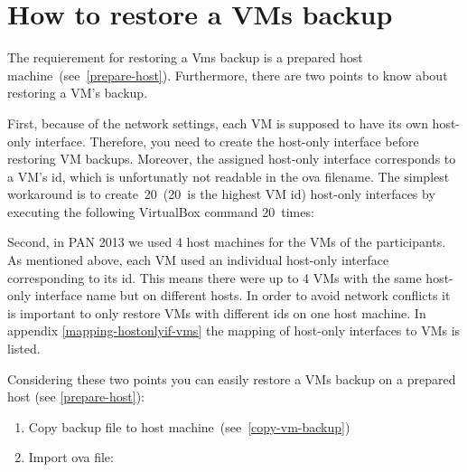 \section{How to restore a VMs backup}
The requierement for restoring a Vms backup is a prepared host machine~(see~\ref{prepare-host}). Furthermore, there are two points to know about restoring a VM's backup.

\medskip\noindent
First, because of the network settings, each VM is supposed to have its own host-only interface. Therefore, you need to create the host-only interface before restoring VM backups. Moreover, the assigned host-only interface corresponds to a VM's id, which is unfortunatly not readable in the ova filename. The simplest workaround is to create~20~(20~is the highest VM id) host-only interfaces by executing the following VirtualBox command 20~times:\\

\medskip\noindent
Second, in PAN 2013 we used 4 host machines for the VMs of the participants. As mentioned above, each VM used an individual host-only interface corresponding to its id. This means there were up to 4 VMs with the same host-only interface name but on different hosts. In order to avoid network conflicts it is important to only restore VMs with different ids on one host machine. In appendix \ref{mapping-hostonlyif-vms} the mapping of host-only interfaces to VMs is listed.

\medskip\noindent
Considering these two points you can easily restore a VMs backup on a prepared host (see \ref{prepare-host}):
\begin{enumerate}
\item Copy backup file to host machine~(see~\ref{copy-vm-backup})
\item Import ova file:\\
\end{enumerate}


